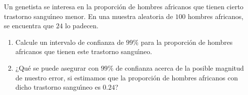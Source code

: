 \begin{enunciado}
 Un genetista se interesa en la proporci\'on de hombres africanos que tienen cierto trastorno sangu\'{\i}neo menor. En una muestra aleatoria de $100$ hombres africanos, se encuentra que $24$ lo padecen.
 \begin{enumerate}
  \item Calcule un intervalo de confianza de $99\%$ para la proporci\'on de hombres africanos que tienen este trastorno sangu\'{\i}neo.
  
  \item ¿Qu\'e se puede asegurar con $99\%$ de confianza acerca de la posible magnitud de nuestro error, si estimamos que la proporci\'on de hombres africanos con dicho trastorno sangu\'{\i}neo es $0.24$?
 \end{enumerate}
\end{enunciado}

